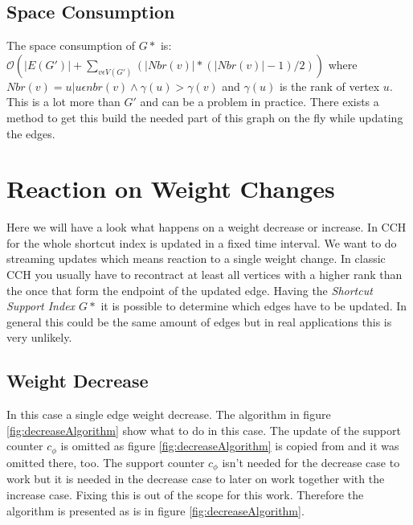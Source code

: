 \documentclass[twocolumn]{article}
\begin{document}
\subsection{Space Consumption} \label{Space Consumption}

The space consumption of $G*$ is: 
\\
$\mathcal{O}(\vert E(G') \vert + \sum_{v \epsilon  V(G')}(\vert Nbr(v) \vert * (\vert Nbr(v) \vert-1)/2))$
where $Nbr(v) = {u\vert u \epsilon nbr(v) \land \gamma(u) > \gamma(v) }$ and $\gamma(u)$ is the rank of vertex $u$.
This is a lot more than $G'$ and can be a problem in practice. There exists a method to get this build the needed
part of this graph on the fly while updating the edges. 

\section{Reaction on Weight Changes}

Here we will have a look what happens on a weight decrease or increase. 
In CCH for the whole shortcut index is updated in a fixed time interval. We want to 
do streaming updates which means reaction to a single weight change. In classic
CCH you usually have to recontract at least all vertices with a higher rank than
the once that form the endpoint of the updated edge. Having the \textit{Shortcut Support Index $G*$}
it is possible to determine which edges have to be updated. In general this could
be the same amount of edges but in real applications this is very unlikely.

\subsection{Weight Decrease}

In this case a single edge weight decrease. The algorithm in figure \ref{fig:decreaseAlgorithm} 
show what to do in this case. The update of the support counter $c_{\phi}$ is omitted as
figure \ref{fig:decreaseAlgorithm} is copied from \cite{Ouyang2020} and it was omitted there, too. The support counter $c_{\phi}$
isn't needed for the decrease case to work but it is needed in the decrease case to later on 
work together with the increase case. Fixing this is out of the scope for this work. Therefore the 
algorithm is presented as is in figure \ref{fig:decreaseAlgorithm}. 
\end{document}
